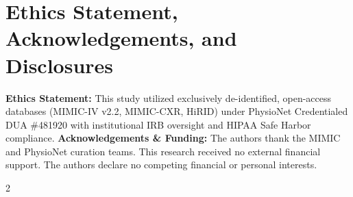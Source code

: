 \documentclass[10pt, onecolumn]{article}
\begin{document}
\section*{Ethics Statement, Acknowledgements, and Disclosures}
\footnotesize
\noindent\textbf{Ethics Statement:} This study utilized exclusively de-identified, open-access databases (MIMIC-IV v2.2, MIMIC-CXR, HiRID) under PhysioNet Credentialed DUA \#481920 with institutional IRB oversight and HIPAA Safe Harbor compliance.
\textbf{Acknowledgements \& Funding:} The authors thank the MIMIC and PhysioNet curation teams. This research received no external financial support. The authors declare no competing financial or personal interests.

\begingroup
\scriptsize
\setlength{\bibsep}{0.6pt plus 0.2pt minus 0.1pt}
\begin{multicols}{2}


\end{multicols}
\endgroup
\end{document}
